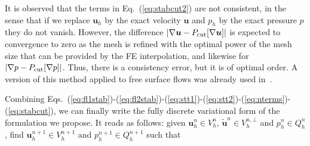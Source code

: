\documentclass[11pt,a4paper,oneside,reqno]{amsart}
\newcommand{\Eq}[1]{(\ref{eq:#1})}
\def\u{{\bm u}}
\begin{document}
It is observed that the terms in Eq.~\Eq{stabcut2} are not consistent, in the sense that if we replace $\u_h$ by the exact velocity $\u$ and $p_h$ by the exact pressure $p$ they do not vanish. However, the difference $\vert \nabla \u - P_{\rm cut}[\nabla \u]\vert $ is expected to convergence to zero as the mesh is refined with the optimal power of the mesh size that can be provided by the FE interpolation, and likewise for $\vert \nabla p - P_{\rm cut}[\nabla p]\vert $. Thus, there is a consistency error, but it is of optimal order. A version of this method applied to free surface flows was already used in~\cite{baiges-et-al-2017}.

Combining Eqs.~\Eq{fl1stab}-\Eq{fl2stab}-\Eq{stt1}-\Eq{stt2}-\Eq{nterms}-\Eq{stabcut}, we can finally write the fully discrete variational form of the formulation we propose. It reads as follows: given $\u^n_h\in V^n_h$, $\tilde{\u}^n\in V_h^{n,\bot}$ and $p^n_h\in Q^n_h$, find $\u^{n+1}_h\in V^{n+1}_h$ and $p^{n+1}_h\in Q^{n+1}_h$ such that
\end{document}
